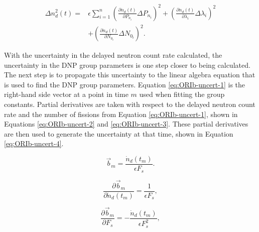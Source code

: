 \documentclass{style/nseJournal}
\begin{document}

\begin{equation}
\begin{split}
\Delta n_d^2(t)  =&   \epsilon  \sum_{i=1}^n \left( \frac{\partial \dot{n}_d(t)}{\partial P_{n_i}} \Delta P_{n_i} \right)^2 + \left( \frac{\partial \dot{n}_d(t)}{\partial \lambda_{i}} \Delta \lambda_i \right)^2 \\
& +  \left( \frac{\partial \dot{n}_d(t)}{\partial N_{0_i}} \Delta N_{0_i} \right)^2 .
\end{split}
\label{eq:ORI-uncert-4}
\end{equation}

With the uncertainty in the delayed neutron count rate calculated, the uncertainty in the DNP group parameters is one step closer to being calculated.
The next step is to propagate this uncertainty to the linear algebra equation that is used to find the DNP group parameters.
Equation \eqref{eq:ORIb-uncert-1} is the right-hand side vector at a point in time $m$ used when fitting the group constants.
Partial derivatives are taken with respect to the delayed neutron count rate and the number of fissions from Equation \eqref{eq:ORIb-uncert-1}, shown in Equations \eqref{eq:ORIb-uncert-2} and \eqref{eq:ORIb-uncert-3}. These partial derivatives are then used to generate the uncertainty at that time, shown in Equation \eqref{eq:ORIb-uncert-4}.

\begin{equation}
\vec{b}_m = \frac{\dot{n}_d(t_m)}{\epsilon F_s} .
\label{eq:ORIb-uncert-1}
\end{equation}

\begin{equation}
\frac{\partial \vec{b}_m}{\partial \dot{n}_d(t_m)} = \frac{1}{\epsilon F_s} ,
\label{eq:ORIb-uncert-2}
\end{equation}

\begin{equation}
\frac{\partial \vec{b}_m}{\partial F_s} = - \frac{\dot{n}_d(t_m)}{\epsilon F_s^2} ,
\label{eq:ORIb-uncert-3}
\end{equation}
\end{document}
